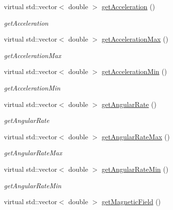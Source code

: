 \begin{DoxyCompactItemize}
\item 
virtual std\-::vector$<$ double $>$ \hyperlink{classdrobot_1_1device_1_1vestibular_1_1PhidgetVestibular_a70f361e5840a67882a5dfbe486e8c0ad}{get\-Acceleration} ()
\begin{DoxyCompactList}\small\item\em get\-Acceleration \end{DoxyCompactList}\item 
virtual std\-::vector$<$ double $>$ \hyperlink{classdrobot_1_1device_1_1vestibular_1_1PhidgetVestibular_a0d4ef25da6879974f9a1d17a611925c0}{get\-Acceleration\-Max} ()
\begin{DoxyCompactList}\small\item\em get\-Acceleration\-Max \end{DoxyCompactList}\item 
virtual std\-::vector$<$ double $>$ \hyperlink{classdrobot_1_1device_1_1vestibular_1_1PhidgetVestibular_a3ce309226cfea7d6f7e863f047b30419}{get\-Acceleration\-Min} ()
\begin{DoxyCompactList}\small\item\em get\-Acceleration\-Min \end{DoxyCompactList}\item 
virtual std\-::vector$<$ double $>$ \hyperlink{classdrobot_1_1device_1_1vestibular_1_1PhidgetVestibular_aa3161475a5ab72949ccfac98d58feebe}{get\-Angular\-Rate} ()
\begin{DoxyCompactList}\small\item\em get\-Angular\-Rate \end{DoxyCompactList}\item 
virtual std\-::vector$<$ double $>$ \hyperlink{classdrobot_1_1device_1_1vestibular_1_1PhidgetVestibular_a8fb6ce7fc0425ffc280971fe75779988}{get\-Angular\-Rate\-Max} ()
\begin{DoxyCompactList}\small\item\em get\-Angular\-Rate\-Max \end{DoxyCompactList}\item 
virtual std\-::vector$<$ double $>$ \hyperlink{classdrobot_1_1device_1_1vestibular_1_1PhidgetVestibular_afeec4d1d479bd7c9bfd2c9efeb8e7f84}{get\-Angular\-Rate\-Min} ()
\begin{DoxyCompactList}\small\item\em get\-Angular\-Rate\-Min \end{DoxyCompactList}\item 
virtual std\-::vector$<$ double $>$ \hyperlink{classdrobot_1_1device_1_1vestibular_1_1PhidgetVestibular_a0ca904d6cbffeb441834f22e8c808b50}{get\-Magnetic\-Field} ()

\end{DoxyCompactItemize}

